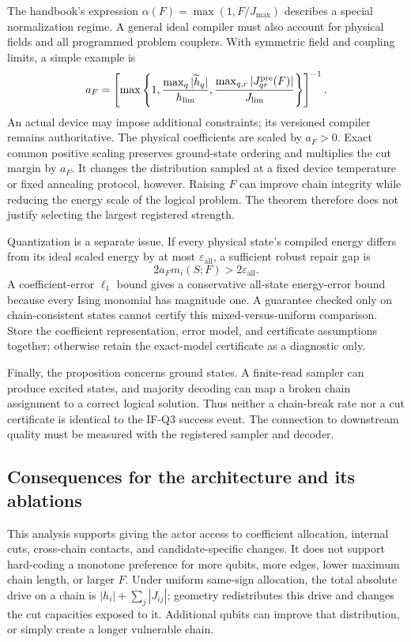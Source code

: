 \documentclass[11pt,a4paper]{article}
\theoremstyle{definition}\newtheorem{definition}[proposition]{Definition}
\begin{document}
The handbook's expression $\alpha(F)=\max(1,F/J_{\max})$ describes a special normalization regime. A general ideal compiler must also account for physical fields and all programmed problem couplers. With symmetric field and coupling limits, a simple example is
\[
 a_F=\left[\max\left\{1,
       \frac{\max_q|\widetilde h_q|}{h_{\rm lim}},
       \frac{\max_{q,r}|J^{\mathrm{pre}}_{qr}(F)|}{J_{\rm lim}}
       \right\}\right]^{-1}.
\]
An actual device may impose additional constraints; its versioned compiler remains authoritative. The physical coefficients are scaled by $a_F>0$. Exact common positive scaling preserves ground-state ordering and multiplies the cut margin by $a_F$. It changes the distribution sampled at a fixed device temperature or fixed annealing protocol, however. Raising $F$ can improve chain integrity while reducing the energy scale of the logical problem. The theorem therefore does not justify selecting the largest registered strength.

Quantization is a separate issue. If every physical state's compiled energy differs from its ideal scaled energy by at most $\varepsilon_{\mathrm{all}}$, a sufficient robust repair gap is
\[
 2a_Fm_i(S;F)>2\varepsilon_{\mathrm{all}}.
\]
A coefficient-error $\ell_1$ bound gives a conservative all-state energy-error bound because every Ising monomial has magnitude one. A guarantee checked only on chain-consistent states cannot certify this mixed-versus-uniform comparison. Store the coefficient representation, error model, and certificate assumptions together; otherwise retain the exact-model certificate as a diagnostic only.

Finally, the proposition concerns ground states. A finite-read sampler can produce excited states, and majority decoding can map a broken chain assignment to a correct logical solution. Thus neither a chain-break rate nor a cut certificate is identical to the IF-Q3 success event. The connection to downstream quality must be measured with the registered sampler and decoder.

\subsection{Consequences for the architecture and its ablations}
\label{theory:architecture}

This analysis supports giving the actor access to coefficient allocation, internal cuts, cross-chain contacts, and candidate-specific changes. It does not support hard-coding a monotone preference for more qubits, more edges, lower maximum chain length, or larger $F$. Under uniform same-sign allocation, the total absolute drive on a chain is $|h_i|+\sum_j|J_{ij}|$; geometry redistributes this drive and changes the cut capacities exposed to it. Additional qubits can improve that distribution, or simply create a longer vulnerable chain.
\end{document}
